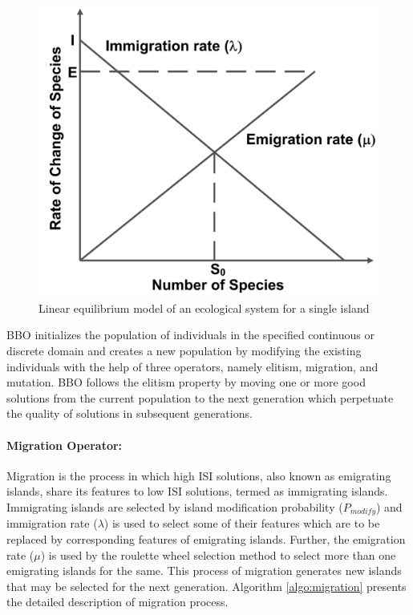 \begin{figure}
\centering
\includegraphics[width=0.38\linewidth]{Equi}
  \caption[ Linear equilibrium model of an ecological system for a single island ]{ \fontsize{12}{10} \selectfont Linear equilibrium model of an ecological system for a single island \cite{Simon2008}}\label{fig:equil}
\end{figure}

BBO initializes the population of individuals in the specified continuous or discrete domain and creates a new population by modifying the existing individuals with the help of three operators, namely elitism, migration, and mutation. BBO follows the elitism property by moving one or more good solutions from the current population to the next generation which perpetuate the quality of solutions in subsequent generations. 


\paragraph{Migration Operator:} Migration is the process in which high ISI solutions, also known as emigrating islands, share its features to low ISI solutions, termed as immigrating islands. Immigrating islands are selected by island modification probability ($P_{modify}$) and immigration rate ($\lambda$) is used to select some of their features which are to be replaced by corresponding features of emigrating islands. Further, the emigration rate ($\mu$) is used by the roulette wheel selection method to select more than one emigrating islands for the same. This process of migration generates new islands that may be selected for the next generation. Algorithm \ref{algo:migration} presents the detailed description of migration process.

